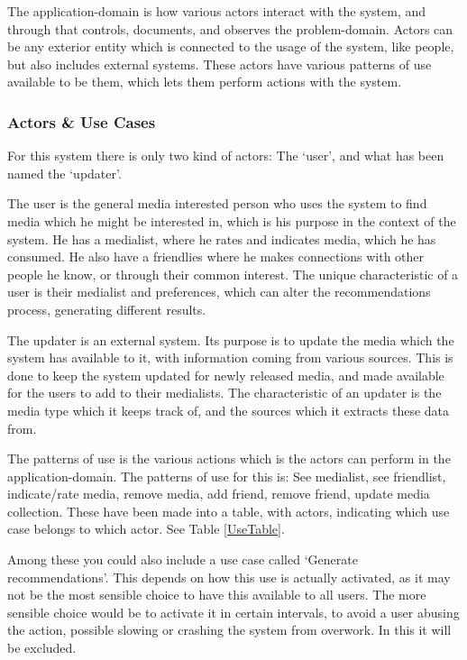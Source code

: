 The application-domain is how various actors interact with the system, and through that controls, documents, and observes the problem-domain. Actors can be any exterior entity which is connected to the usage of the system, like people, but also includes external systems. These actors have various patterns of use available to be them, which lets them perform actions with the system.

\subsubsection{Actors \& Use Cases}

For this system there is only two kind of actors: The ‘user’, and what has been named the ‘updater’.

The user is the general media interested person who uses the system to find media which he might be interested in, which is his purpose in the context of the system. He has a medialist, where he rates and indicates media, which he has consumed. He also have a friendlies where he makes connections with other people he know, or through their common interest. The unique characteristic of a user is their medialist and preferences, which can alter the recommendations process, generating different results.

The updater is an external system. Its purpose is to update the media which the system has available to it, with information coming from various sources. This is done to keep the system updated for newly released media, and made available for the users to add to their medialists. The characteristic of an updater is the media type which it keeps track of, and the sources which it extracts these data from.

The patterns of use is the various actions which is the actors can perform in the application-domain. The patterns of use for this is: See medialist, see friendlist, indicate/rate media, remove media, add friend, remove friend, update media collection. These have been made into a table, with actors, indicating which use case belongs to which actor. See Table \ref{UseTable}.

Among these you could also include a use case called ‘Generate recommendations’. This depends on how this use is actually activated, as it may not be the most sensible choice to have this available to all users. The more sensible choice would be to activate it in certain intervals, to avoid a user abusing the action, possible slowing or crashing the system from overwork. In this it will be excluded.

